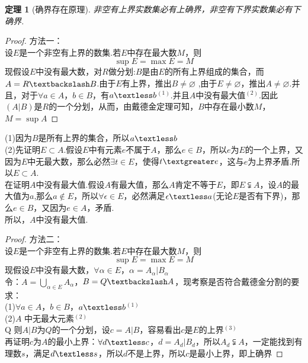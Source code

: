 \documentclass[12pt, a4paper, oneside]{ctexart}
\newtheorem{theorem}{定理}[section]
\begin{document}
\begin{theorem}[确界存在原理]
非空有上界实数集必有上确界，非空有下界实数集必有下确界.
\end{theorem}

\begin{proof}
方法一：\\
设$E$是一个非空有上界的数集.若$E$中存在最大数$M$，则
\begin{equation*}
    \sup E=\max E=M
\end{equation*}
现假设$E$中没有最大数，对$R$做分划:$B$是由$E$的所有上界组成的集合，而$A=R\textbackslash B$.由于$E$有上界，推出$B\neq \varnothing$ ,由于$E\neq \varnothing$，推出$A \neq \varnothing$.并且，对于$\forall a\in A$，$b\in B$，有$a\textless b$$^{(1)}$.并且$A$中没有最大值$^{(2)}$.因此$(A|B)$是$R$的一个分划，从而，由戴德金定理可知，$B$中存在最小数$M$，$M=\sup A$
\end{proof}

(1)因为$B$是所有上界的集合，所以$a\textless b$\\
(2)先证明$E\subset A$.假设$E$中有元素$e$不属于$A$，那么$e\in B$，所以$e$为$E$的一个上界，又因为$E$中无最大数，那么必然$\exists t\in E$，使得$t\textgreater e$，这与$e$为上界矛盾.所以$E\subset A$.\\
在证明$A$中没有最大值.假设$A$有最大值，那么$A$肯定不等于$E$，即$E\subsetneqq A$，设$A$的最大值为$a$,那么$a\not\in E$，所以$\forall \epsilon \in E$，必然满足$\epsilon \textless a$(无论$E$是否有下界)，那么$e\in B$，又因为$e\in A$，矛盾.\\
所以，$A$中没有最大值.
\begin{proof}
方法二：\\
设$E$是一个非空有上界的数集.若$E$中存在最大数$M$，则
\begin{equation*}
    \sup E=\max E=M
\end{equation*}
现假设$E$中没有最大数，$\forall \alpha \in E $，$\alpha=A_{\alpha}|B_{\alpha}$\\
令：$A=\bigcup_{\alpha \in E} A_{\alpha}$，$B=Q \textbackslash A$，现考察是否符合戴德金分割的要求：\\
(1)$\forall a\in A$，$b\in B$，$a\textless b$$^{(1)}$\\
(2)$A$ 中无最大元素$^{(2)}$\\Q
则$A|B$为$Q$的一个分划，设$c=A|B$，容易看出$c$是$E$的上界$^{(3)}$\\
再证明$c$为$A$的最小上界：$\forall d \textless c$，$d=A_d|B_d$，所以$A_d \subsetneqq A$，一定能找到有理数$s$，满足$d \textless s$，所以$d$不是上界，所以$c$是最小上界，即上确界
\end{proof}
\end{document}
